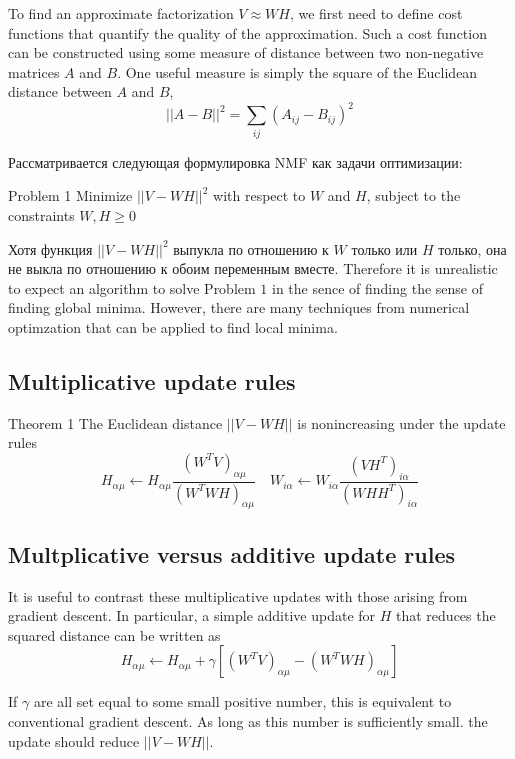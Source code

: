 \documentclass[oneside, final, 14pt]{extarticle}
\begin{document}
To find an approximate factorization $V \approx WH$, we first need
to define cost functions that quantify the quality of the
approximation. Such a cost function can be constructed using some
measure of distance between two non-negative matrices $A$ and $B$.
One useful measure is simply the square of the Euclidean distance
between $A$ and $B$,
\begin{equation}
  ||A - B||^2 = \sum_{ij}(A_{ij}-B_{ij})^2
\end{equation}

Рассматривается следующая формулировка NMF как задачи оптимизации:

Problem 1 Minimize $||V - W H ||^2$ with respect to $W$ and $H$,
subject to the constraints $W, H \geqslant 0$

Хотя функция $||V - WH||^2$ выпукла по отношению к $W$ только или
$H$ только, она не выкла по отношению к обоим переменным вместе.
Therefore it is unrealistic to expect an algorithm
to solve Problem $1$ in the sence of finding the sense of finding
global minima. However, there are many techniques from numerical
optimzation that can be applied to find local minima.

\subsection{Multiplicative update rules}

Theorem 1 The Euclidean distance $||V - WH||$ is nonincreasing under
the update rules
\begin{equation}
  H_{\alpha\mu} \leftarrow H_{\alpha\mu}
  \frac{(W^TV)_{\alpha\mu}}{(W^TWH)_{\alpha\mu}} \quad
  W_{i\alpha} \leftarrow W_{i\alpha}
  \frac{(VH^T)_{i\alpha}}{(WHH^T)_{i\alpha}}
\end{equation}

\subsection{Multplicative versus additive update rules}
It is useful to contrast these multiplicative updates with those
arising from gradient descent. In particular, a simple additive
update for $H$ that reduces the squared distance can be written
as
\begin{equation}
  H_{\alpha\mu} \leftarrow H_{\alpha\mu} + \gamma [
    (W^TV)_{\alpha\mu} - (W^TWH)_{\alpha\mu}
  ]
\end{equation}

If $\gamma$ are all set equal to some small positive number, this is
equivalent to conventional gradient descent. As long as this number
is sufficiently small. the update should reduce $||V-WH||$.
\end{document}
